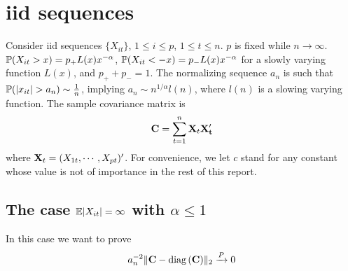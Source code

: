\documentclass{article}
\begin{document}
\section{iid sequences}
Consider iid sequences $\{X_{it}\}$, $1 \leq i \leq p$, $1 \leq t \leq
n$. $p$ is fixed while $n \to \infty$. $\mathbb{P}(X_{it} > x) = p_+ L(x)
x^{-\alpha}$, $\mathbb{P}(X_{it} < -x) = p_- L(x) x^{-\alpha}$ for a slowly
varying function $L(x)$, and $p_+ + p_- = 1$. The normalizing sequence
$a_n$ is such that $\mathbb{P}(|x_{it}| > a_n) \sim {1 \over n}$, implying
$a_n \sim n^{1/\alpha} l(n)$, where $l(n)$ is a slowing varying
function. The sample covariance matrix is
\[
\mathbf{C} = \sum_{t=1}^n \mathbf{X}_t \mathbf{X'_t}
\]
where $\mathbf{X}_t = (X_{1t}, \cdots, X_{pt})'$.
For convenience, we let $c$ stand for any constant whose value is not
of importance in the rest of this report.

\subsection{The case $\mathbb{E}|X_{it}| = \infty$ with $\alpha \leq 1$}
In this case we want to prove
\[
a_n^{-2}\|\mathbf{C} - \text{diag\,}(\mathbf{C})\|_2 \xrightarrow{P} 0
\]
\end{document}
